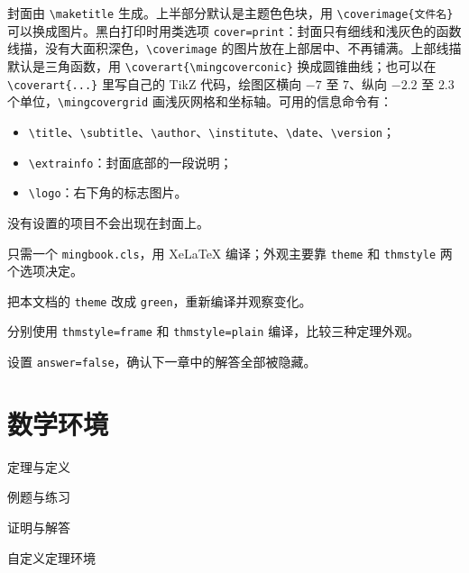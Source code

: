 \documentclass[lang=cn, theme=blue, thmstyle=fancy, twoside]{mingbook}
\begin{document}
封面由 \verb|\maketitle| 生成。上半部分默认是主题色色块，用 \verb|\coverimage{文件名}| 可以换成图片。黑白打印时用类选项 \verb|cover=print|：封面只有细线和浅灰色的函数线描，没有大面积深色，\verb|\coverimage| 的图片放在上部居中、不再铺满。上部线描默认是三角函数，用 \verb|\coverart{\mingcoverconic}| 换成圆锥曲线；也可以在 \verb|\coverart{...}| 里写自己的 TikZ 代码，绘图区横向 $-7$ 至 $7$、纵向 $-2.2$ 至 $2.3$ 个单位，\verb|\mingcovergrid| 画浅灰网格和坐标轴。可用的信息命令有：
\begin{itemize}
  \item \verb|\title|、\verb|\subtitle|、\verb|\author|、\verb|\institute|、\verb|\date|、\verb|\version|；
  \item \verb|\extrainfo|：封面底部的一段说明；
  \item \verb|\logo|：右下角的标志图片。
\end{itemize}
没有设置的项目不会出现在封面上。

\begin{summary}
  只需一个 \texttt{mingbook.cls}，用 XeLaTeX 编译；外观主要靠 \texttt{theme} 和 \texttt{thmstyle} 两个选项决定。
\end{summary}

\begin{problemset}
  \item 把本文档的 \texttt{theme} 改成 \texttt{green}，重新编译并观察变化。
  \item 分别使用 \texttt{thmstyle=frame} 和 \texttt{thmstyle=plain} 编译，比较三种定理外观。
  \item 设置 \texttt{answer=false}，确认下一章中的解答全部被隐藏。
\end{problemset}

\chapter{数学环境}\label{chap:math}

\begin{introduction}
  \item 定理与定义
  \item 例题与练习
  \item 证明与解答
  \item 自定义定理环境
\end{introduction}
\end{document}
